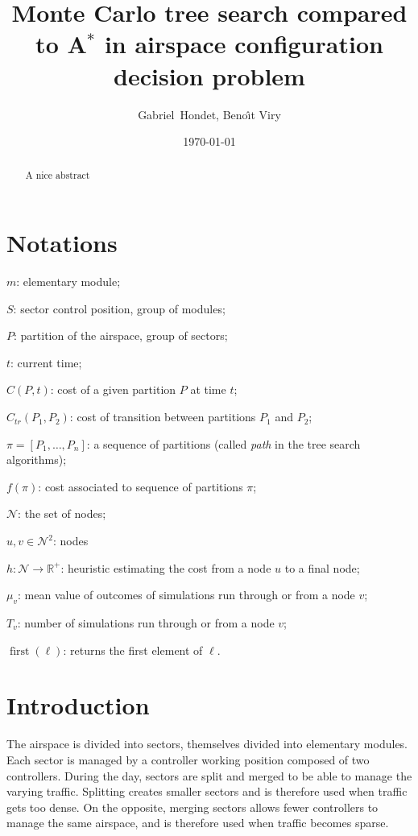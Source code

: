 \documentclass[oneside,twocolumn]{article}
\title{Monte Carlo tree search compared to A\(^*\) in airspace configuration
decision problem}
\author{Gabriel~Hondet, Beno\^{\i}t Viry}
\date{\today}
\DeclareMathOperator{\first}{first}
\begin{document}
\maketitle

\begin{abstract}
  A nice abstract
\end{abstract}


\section*{Notations}
\begin{compactitem}
  \item $m$: elementary module;
  \item $S$: sector control position, group of modules;
  \item $P$: partition of the airspace, group of sectors;
  \item $t$: current time;
  \item $C(P, t)$: cost of a given partition $P$ at time $t$;
  \item \(C_{tr}(P_1, P_2)\): cost of transition between partitions \(P_1\) and
    \(P_2\);
  \item \(\pi = [P_1, \dots, P_n]\): a sequence of partitions (called \emph{path}
      in the tree search algorithms);
  \item \(f(\pi)\): cost associated to sequence of partitions \(\pi\);
  \item \(\mathcal{N}\): the set of nodes;
  \item \(u, v \in \mathcal{N}^2\): nodes
  \item $h \colon \mathcal{N} \to \mathbb{R}^+$: heuristic estimating the cost
    from a node \(u\) to a final node;
  \item \(\mu_v\): mean value of outcomes of simulations run through or from a
    node \(v\);
  \item \(T_v\): number of simulations run through or from a node \(v\);
  \item \(\first(\ell)\): returns the first element of \(\ell\).
\end{compactitem}

\section{Introduction}
The airspace is divided into sectors, themselves divided into elementary
modules. Each sector is managed by a controller working position composed of two
controllers.
During the day, sectors are split and merged to be able to
manage the varying traffic. Splitting creates smaller sectors and is therefore
used when traffic gets too dense. On the opposite, merging sectors allows fewer
controllers to manage the same airspace, and is therefore used when traffic
becomes sparse.
\end{document}
